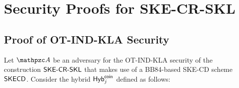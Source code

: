 \ifnum{}
\section{Security Proofs for SKE-CR-SKL}\label{appsec:security_proofs_for_ske_cr_skl}
\fi
\subsection{Proof of OT-IND-KLA Security}\label{proof:ot-ind}


Let $\qA$ be an adversary for the OT-IND-KLA security of the
construction $\mathsf{SKE}\textrm{-}\mathsf{CR}\textrm{-}\mathsf{SKL}$ that makes use of a BB84-based
SKE-CD scheme $\mathsf{SKECD}$. Consider the hybrid $\mathsf{Hyb}_j^{\mathsf{coin}}$ defined
as  follows:

